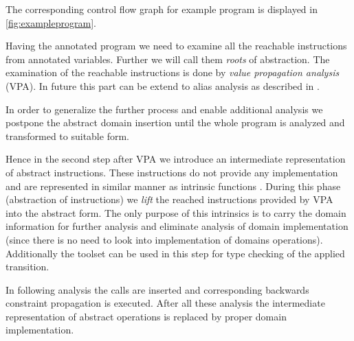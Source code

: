 
The corresponding control flow graph for example program is displayed in
\autoref{fig:exampleprogram}.

Having the annotated program we need to examine all the reachable instructions
from annotated variables. Further we will call them \emph{roots} of abstraction.
The examination of the reachable instructions is done by \emph{value propagation
analysis} (VPA).
In future this part can be extend to alias analysis as described in
\cite{Rockai15}.

In order to generalize the further process and enable additional analysis we
postpone the abstract domain insertion until the whole program is analyzed and
transformed to suitable form.

Hence in the second step after VPA we introduce an intermediate representation of
abstract instructions. These instructions do not provide any implementation and
are represented in similar manner as \LLVM intrinsic functions
\cite{LLVM:langref}. During this phase (abstraction of instructions) we
\emph{lift} the reached instructions provided by VPA into the abstract form. The
only purpose of this intrinsics is to carry the domain information for further
analysis and eliminate analysis of domain implementation (since there is no need
to look into implementation of domains operations). Additionally the \LLVM
toolset can be used in this step for type checking of the applied transition.

In following analysis the  calls are inserted and corresponding
backwards constraint propagation is executed. After all these analysis the
intermediate representation of abstract operations is replaced by proper domain
implementation.

